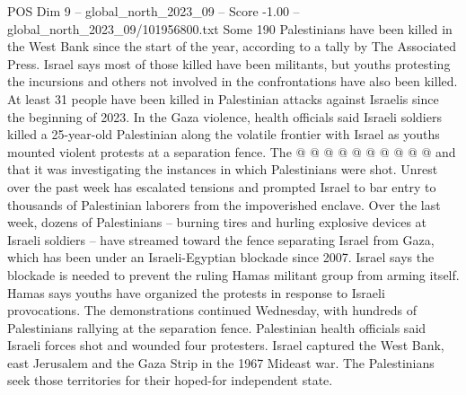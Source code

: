 \begin{textsample}{POS Dim 9 – global\_north\_2023\_09 – Score -1.00 – global\_north\_2023\_09/101956800.txt}
Some 190 Palestinians have been killed in the West Bank since the start of the year, according to a tally by The Associated Press.
Israel says most of those killed have been militants, but youths protesting the incursions and others not involved in the confrontations have also been killed.
At least 31 people have been killed in Palestinian attacks against Israelis since the beginning of 2023.
In the Gaza violence, health officials said Israeli soldiers killed a 25-year-old Palestinian along the volatile frontier with Israel as youths mounted violent protests at a separation fence.
The @ @ @ @ @ @ @ @ @ @ and that it was investigating the instances in which Palestinians were shot.
Unrest over the past week has escalated tensions and prompted Israel to bar entry to thousands of Palestinian laborers from the impoverished enclave.
Over the last week, dozens of Palestinians -- burning tires and hurling explosive devices at Israeli soldiers -- have streamed toward the fence separating Israel from Gaza, which has been under an Israeli-Egyptian blockade since 2007.
Israel says the blockade is needed to prevent the ruling Hamas militant group from arming itself.
Hamas says youths have organized the protests in response to Israeli provocations.
The demonstrations continued Wednesday, with hundreds of Palestinians rallying at the separation fence.
Palestinian health officials said Israeli forces shot and wounded four protesters.
Israel captured the West Bank, east Jerusalem and the Gaza Strip in the 1967 Mideast war.
The Palestinians seek those territories for their hoped-for independent state.

\end{textsample}
